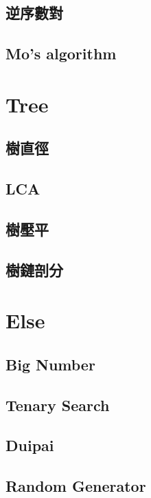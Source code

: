 \subsection{逆序數對}

\subsection{Mo's algorithm}


\section{Tree}
\subsection{樹直徑}

\subsection{LCA}

\subsection{樹壓平}

\subsection{樹鏈剖分}


\section{Else}
\subsection{Big Number}

\subsection{Tenary Search}

\subsection{Duipai}

\subsection{Random Generator}
